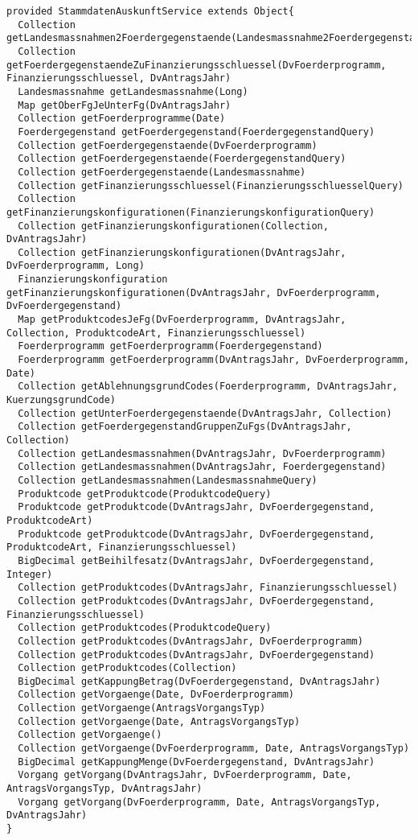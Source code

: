 \begin{lstlisting}[style = dsl, caption = Deklartion von StammdatenAuskunftService, captionpos = b, label = lst_std]
provided StammdatenAuskunftService extends Object{
  Collection getLandesmassnahmen2Foerdergegenstaende(Landesmassnahme2FoerdergegenstandQuery)
  Collection getFoerdergegenstaendeZuFinanzierungsschluessel(DvFoerderprogramm, Finanzierungsschluessel, DvAntragsJahr)
  Landesmassnahme getLandesmassnahme(Long)
  Map getOberFgJeUnterFg(DvAntragsJahr)
  Collection getFoerderprogramme(Date)
  Foerdergegenstand getFoerdergegenstand(FoerdergegenstandQuery)
  Collection getFoerdergegenstaende(DvFoerderprogramm)
  Collection getFoerdergegenstaende(FoerdergegenstandQuery)
  Collection getFoerdergegenstaende(Landesmassnahme)
  Collection getFinanzierungsschluessel(FinanzierungsschluesselQuery)
  Collection getFinanzierungskonfigurationen(FinanzierungskonfigurationQuery)
  Collection getFinanzierungskonfigurationen(Collection, DvAntragsJahr)
  Collection getFinanzierungskonfigurationen(DvAntragsJahr, DvFoerderprogramm, Long)
  Finanzierungskonfiguration getFinanzierungskonfigurationen(DvAntragsJahr, DvFoerderprogramm, DvFoerdergegenstand)
  Map getProduktcodesJeFg(DvFoerderprogramm, DvAntragsJahr, Collection, ProduktcodeArt, Finanzierungsschluessel)
  Foerderprogramm getFoerderprogramm(Foerdergegenstand)
  Foerderprogramm getFoerderprogramm(DvAntragsJahr, DvFoerderprogramm, Date)
  Collection getAblehnungsgrundCodes(Foerderprogramm, DvAntragsJahr, KuerzungsgrundCode)
  Collection getUnterFoerdergegenstaende(DvAntragsJahr, Collection)
  Collection getFoerdergegenstandGruppenZuFgs(DvAntragsJahr, Collection)
  Collection getLandesmassnahmen(DvAntragsJahr, DvFoerderprogramm)
  Collection getLandesmassnahmen(DvAntragsJahr, Foerdergegenstand)
  Collection getLandesmassnahmen(LandesmassnahmeQuery)
  Produktcode getProduktcode(ProduktcodeQuery)
  Produktcode getProduktcode(DvAntragsJahr, DvFoerdergegenstand, ProduktcodeArt)
  Produktcode getProduktcode(DvAntragsJahr, DvFoerdergegenstand, ProduktcodeArt, Finanzierungsschluessel)
  BigDecimal getBeihilfesatz(DvAntragsJahr, DvFoerdergegenstand, Integer)
  Collection getProduktcodes(DvAntragsJahr, Finanzierungsschluessel)
  Collection getProduktcodes(DvAntragsJahr, DvFoerdergegenstand, Finanzierungsschluessel)
  Collection getProduktcodes(ProduktcodeQuery)
  Collection getProduktcodes(DvAntragsJahr, DvFoerderprogramm)
  Collection getProduktcodes(DvAntragsJahr, DvFoerdergegenstand)
  Collection getProduktcodes(Collection)
  BigDecimal getKappungBetrag(DvFoerdergegenstand, DvAntragsJahr)
  Collection getVorgaenge(Date, DvFoerderprogramm)
  Collection getVorgaenge(AntragsVorgangsTyp)
  Collection getVorgaenge(Date, AntragsVorgangsTyp)
  Collection getVorgaenge()
  Collection getVorgaenge(DvFoerderprogramm, Date, AntragsVorgangsTyp)
  BigDecimal getKappungMenge(DvFoerdergegenstand, DvAntragsJahr)
  Vorgang getVorgang(DvAntragsJahr, DvFoerderprogramm, Date, AntragsVorgangsTyp, DvAntragsJahr)
  Vorgang getVorgang(DvFoerderprogramm, Date, AntragsVorgangsTyp, DvAntragsJahr)
}
\end{lstlisting}
